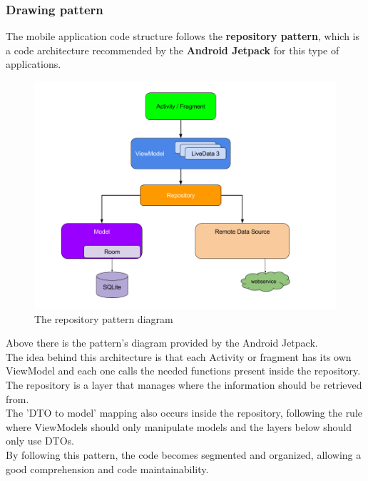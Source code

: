 \subsubsection{Drawing pattern}

The mobile application code structure follows the \textbf{repository pattern}, which is a code architecture recommended by the \textbf{Android Jetpack}\cite{jetpack} for this type of applications.\\

\begin{figure}[H]
    \begin{center}
        \includegraphics[scale=0.5]{_figures/repository_pattern2.png}
        \caption{The repository pattern diagram}
    \end{center}
\end{figure}

Above there is the pattern's diagram provided by the Android Jetpack.\\

The idea behind this architecture is that each Activity or fragment has its own ViewModel and each one calls the needed functions present inside the repository.
The repository is a layer that manages where the information should be retrieved from.\\

The 'DTO to model' mapping also occurs inside the repository, following the rule where ViewModels should only manipulate models and the layers below should only use DTOs.\\

By following this pattern, the code becomes segmented and organized, allowing a good comprehension and code maintainability.\\

